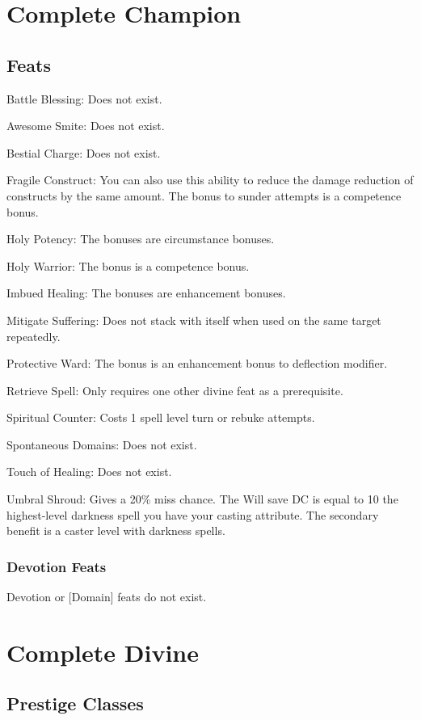 \section{Complete Champion}
\subsection{Feats}
\begin{itemize*}
\item Battle Blessing: Does not exist.
\item Awesome Smite: Does not exist.
\item Bestial Charge: Does not exist.
\item Fragile Construct: You can also use this ability to reduce the damage reduction of constructs by the same amount. The bonus to sunder attempts is a competence bonus.
\item Holy Potency: The bonuses are circumstance bonuses.
\item Holy Warrior: The bonus is a competence bonus.
\item Imbued Healing: The bonuses are enhancement bonuses.
\item Mitigate Suffering: Does not stack with itself when used on the same target repeatedly.
\item Protective Ward: The bonus is an enhancement bonus to deflection modifier.
\item Retrieve Spell: Only requires one other divine feat as a prerequisite.
\item Spiritual Counter: Costs 1 \add spell level turn or rebuke attempts.
\item Spontaneous Domains: Does not exist.
\item Touch of Healing: Does not exist.
\item Umbral Shroud: Gives a 20\% miss chance. The Will save DC is equal to 10 \add the highest-level darkness spell you have \add your casting attribute. The secondary benefit is a  caster level with darkness spells.
\end{itemize*}
\subsubsection{Devotion Feats}
Devotion or [Domain] feats do not exist.

\section{Complete Divine}
\subsection{Prestige Classes}

